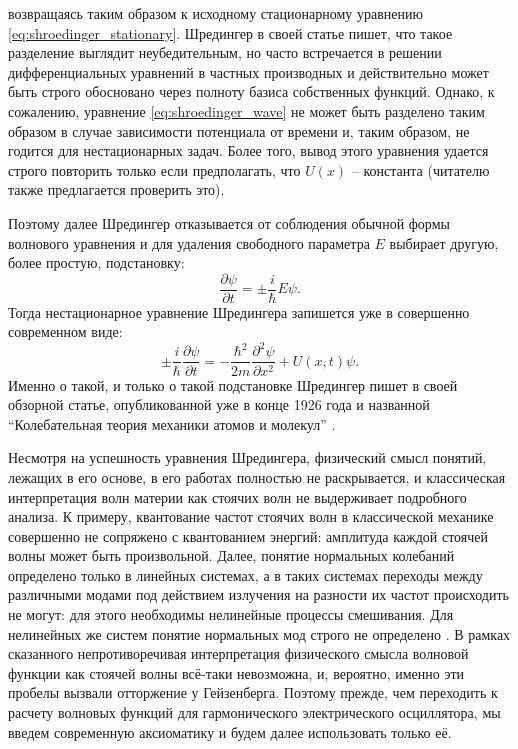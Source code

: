 \documentclass[14pt, a4paper]{extreport}
\numberwithin{equation}{section}
\begin{document}
возвращаясь таким образом к исходному стационарному уравнению \eqref{eq:shroedinger_stationary}.  Шредингер в своей статье пишет, что такое разделение выглядит неубедительным, но часто встречается в решении дифференциальных уравнений в частных производных и действительно может быть строго обосновано через полноту базиса собственных функций. Однако, к сожалению, уравнение \eqref{eq:shroedinger_wave} не может быть разделено таким образом в случае зависимости потенциала от времени и, таким образом, не годится для нестационарных задач. Более того, вывод этого уравнения удается строго повторить только если предполагать, что $U(x)$ -- константа (читателю также предлагается проверить это).

Поэтому далее Шредингер отказывается от соблюдения обычной формы волнового уравнения и для удаления свободного параметра $E$ выбирает другую, более простую, подстановку:
\begin{equation}
	\frac{\partial \psi}{\partial t} = \pm \frac{i}{\hbar} E \psi.
\end{equation}
Тогда нестационарное уравнение Шредингера запишется уже в совершенно современном виде:
\begin{equation}
\pm \frac{i}{\hbar}\frac{\partial \psi}{\partial t}  = -\frac{\hbar^2}{2m} \frac{\partial^2 \psi}{\partial x^2} + U(x,t)\psi.
\end{equation}
Именно о такой, и только о такой подстановке Шредингер пишет в своей обзорной статье, опубликованной уже в конце 1926 года и названной ``Колебательная теория механики атомов и молекул'' \cite{schrodinger1926undulatory}.

Несмотря на успешность уравнения Шредингера, физический смысл понятий, лежащих в его основе, в его работах полностью не раскрывается, и классическая интерпретация волн материи как стоячих волн не выдерживает подробного анализа. К примеру, квантование частот стоячих волн в классической механике совершенно не сопряжено с квантованием энергий: амплитуда каждой стоячей волны может быть произвольной. Далее, понятие нормальных колебаний определено только в линейных системах, а в таких системах переходы между различными модами под действием излучения на разности их частот происходить не могут: для этого необходимы нелинейные процессы смешивания. Для нелинейных же систем понятие нормальных мод строго не определено \cite{kerschen2009nonlinear}. В рамках сказанного непротиворечивая интерпретация физического смысла волновой функции как стоячей волны всё-таки невозможна, и, вероятно, именно эти пробелы вызвали отторжение у Гейзенберга. Поэтому прежде, чем переходить к расчету волновых функций для гармонического электрического осциллятора, мы введем современную аксиоматику и будем далее использовать только её.
\end{document}
